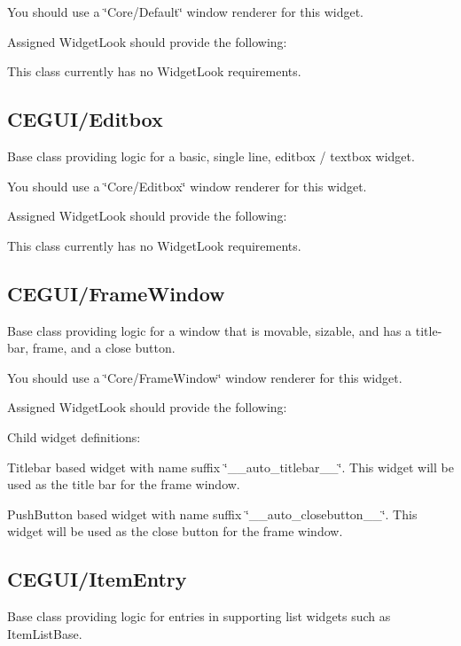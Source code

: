 You should use a \char`\"{}\+Core/\+Default\char`\"{} window renderer for this widget.

Assigned Widget\+Look should provide the following\+: 
\begin{DoxyItemize}
\item This class currently has no Widget\+Look requirements. 
\end{DoxyItemize}\hypertarget{fal_baseclass_ref_fal_baseclass_ref_sec_6}{}\subsection{C\+E\+G\+U\+I/\+Editbox}\label{fal_baseclass_ref_fal_baseclass_ref_sec_6}
Base class providing logic for a basic, single line, editbox / textbox widget.

You should use a \char`\"{}\+Core/\+Editbox\char`\"{} window renderer for this widget.

Assigned Widget\+Look should provide the following\+: 
\begin{DoxyItemize}
\item This class currently has no Widget\+Look requirements. 
\end{DoxyItemize}\hypertarget{fal_baseclass_ref_fal_baseclass_ref_sec_7}{}\subsection{C\+E\+G\+U\+I/\+Frame\+Window}\label{fal_baseclass_ref_fal_baseclass_ref_sec_7}
Base class providing logic for a window that is movable, sizable, and has a title-\/bar, frame, and a close button.

You should use a \char`\"{}\+Core/\+Frame\+Window\char`\"{} window renderer for this widget.

Assigned Widget\+Look should provide the following\+: 
\begin{DoxyItemize}
\item Child widget definitions\+: 
\begin{DoxyItemize}
\item Titlebar based widget with name suffix \char`\"{}\+\_\+\+\_\+auto\+\_\+titlebar\+\_\+\+\_\+\char`\"{}. This widget will be used as the title bar for the frame window. 
\item Push\+Button based widget with name suffix \char`\"{}\+\_\+\+\_\+auto\+\_\+closebutton\+\_\+\+\_\+\char`\"{}. This widget will be used as the close button for the frame window. 
\end{DoxyItemize}
\end{DoxyItemize}\hypertarget{fal_baseclass_ref_fal_baseclass_ref_sec_8}{}\subsection{C\+E\+G\+U\+I/\+Item\+Entry}\label{fal_baseclass_ref_fal_baseclass_ref_sec_8}
Base class providing logic for entries in supporting list widgets such as Item\+List\+Base.

